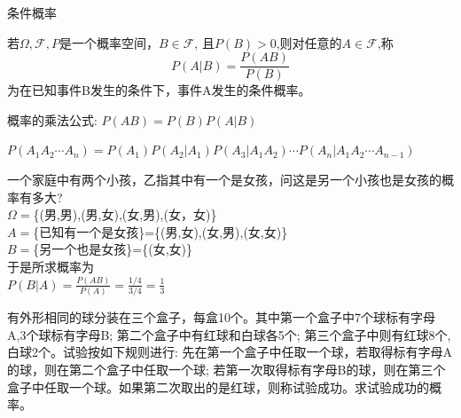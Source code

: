 \begin{frame}{条件概率}
\begin{definition}
	若$\Omega,\mathcal{F},P$是一个概率空间，$B\in\mathcal{F}$, 且$P(B)>0$,则对任意的$A\in\mathcal{F}$,称
	$$P(A|B)=\frac{P(AB)}{P(B)}$$
	为在已知事件B发生的条件下，事件A发生的条件概率。
\end{definition}
\begin{corollary}
概率的乘法公式:  $P(AB)=P(B)P(A|B)$
\end{corollary}

\begin{corollary}
	$P(A_1A_2\cdots A_n)=P(A_1)P(A_2|A_1)P(A_3|A_1A_2)\cdots P(A_n|A_1A_2\cdots A_{n-1})$
\end{corollary}
\end{frame}

\begin{frame}
\begin{example}
	一个家庭中有两个小孩，乙指其中有一个是女孩，问这是另一个小孩也是女孩的概率有多大?\\
	$\Omega=$\{(男,男),(男,女),(女,男),(女，女)\}\\
	$A=$\{已知有一个是女孩\}=\{(男,女),(女,男),(女,女)\}\\
	$B=$\{另一个也是女孩\}=\{(女,女)\}\\
	于是所求概率为\\
	$P(B|A)=\frac{P(AB)}{P(A)}=\frac{1/4}{3/4}=\frac{1}{3}$
\end{example}
\end{frame}

\begin{frame}
\begin{example}
	有外形相同的球分装在三个盒子，每盒10个。其中第一个盒子中7个球标有字母A,3个球标有字母B; 第二个盒子中有红球和白球各5个; 第三个盒子中则有红球8个,白球2个。试验按如下规则进行: 先在第一个盒子中任取一个球，若取得标有字母A的球，则在第二个盒子中任取一个球; 若第一次取得标有字母B的球，则在第三个盒子中任取一个球。如果第二次取出的是红球，则称试验成功。求试验成功的概率。
\end{example}
\end{frame}

